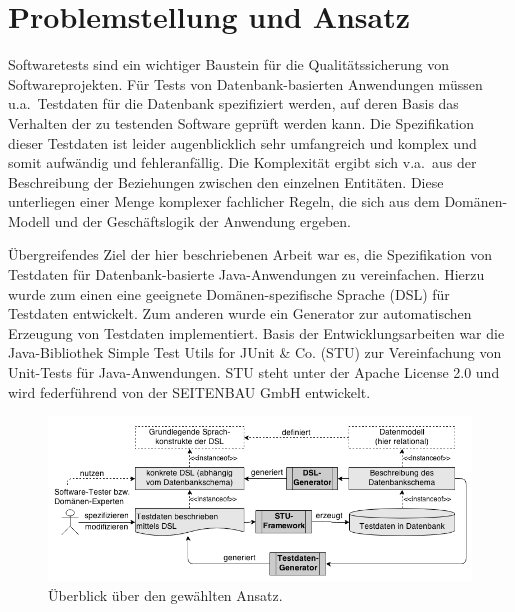 \section{Problemstellung und Ansatz}




Softwaretests sind ein wichtiger Baustein für die Qualitätssicherung von Softwareprojekten. Für Tests von Datenbank-basierten Anwendungen müssen u.a.~Testdaten für die Datenbank spezifiziert werden, auf deren Basis das Verhalten der zu testenden Software 
geprüft werden kann.
%
%
Die Spezifikation dieser Testdaten ist leider augenblicklich sehr umfangreich und komplex und somit aufwändig und fehleranfällig.
%
%
Die Komplexität ergibt sich v.a.~aus der Beschreibung der Beziehungen zwischen den einzelnen Entitäten.
%
Diese unterliegen einer Menge komplexer fachlicher Regeln, die sich aus dem Domänen-Modell und der Geschäftslogik der Anwendung ergeben.
%


Übergreifendes Ziel der hier beschriebenen Arbeit \cite{MT:Moll:2013} war es, die Spezifikation von Testdaten für Datenbank-basierte Java-Anwendungen zu vereinfachen.
%
Hierzu wurde zum einen  eine geeignete Domänen-spezifische Sprache (DSL) für Testdaten entwickelt.
%
%
Zum anderen wurde ein Generator zur automatischen Erzeugung von Testdaten implementiert. 
%
%
%
Basis der Entwicklungsarbeiten war die Java-Bibliothek Simple Test Utils for JUnit \& Co. (STU) zur Vereinfachung von Unit-Tests für Java-Anwendungen.
%
STU steht unter der Apache License 2.0 und wird federführend von der  SEITENBAU GmbH entwickelt. 
%


\begin{figure}[tb]
	\begin{center}
		\includegraphics[width=12.75cm]{images/ansatz.png}
		\caption{\label{ansatz}Überblick über den gewählten Ansatz.}
	\end{center}
\end{figure}

